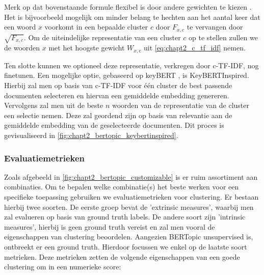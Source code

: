 Merk op dat bovenstaande formule flexibel is door andere gewichten te kiezen \cite{bertopic_c_tf_idf}. Het is bijvoorbeeld mogelijk om minder belang te hechten aan het aantal keer dat een woord $x$ voorkomt in een bepaalde cluster $c$ door $F_{x,c}$ te vervangen door $\sqrt{F_{x,c}}$. Om de uiteindelijke representatie van een cluster $c$ op te stellen zullen we de woorden $x$ met het hoogste gewicht $W_{x,c}$ uit \autoref{eq:chapt2_c_tf_idf} nemen.


Ten slotte kunnen we optioneel deze representatie, verkregen door c-TF-IDF, nog finetunen. Een mogelijke optie, gebaseerd op keyBERT \cite{keybert}, is KeyBERTInspired. Hierbij zal men op basis van c-TF-IDF voor één cluster de best passende documenten selecteren en hiervan een gemiddelde embedding genereren. Vervolgens zal men uit de beste $n$ woorden van de representatie van de cluster een selectie nemen. Deze zal geordend zijn op basis van relevantie aan de gemiddelde embedding van de geselecteerde documenten. Dit proces is gevisualiseerd in \autoref{fig:chapt2_bertopic_keybertinspired}.




\subsubsection{Evaluatiemetrieken}
\label{sec:chapt2_clustering_evaluation}
Zoals afgebeeld in \autoref{fig:chapt2_bertopic_customizable} is er ruim assortiment aan combinaties. Om te bepalen welke combinatie(s) het beste werken voor een specifieke toepassing gebruiken we evaluatiemetrieken voor clustering. Er bestaan hierbij twee soorten. \cite{eval_metrics_scikit,eval_metrics} De eerste groep bevat de 'extrinsic measures', waarbij men zal evalueren op basis van ground truth labels. De andere soort zijn 'intrinsic measures', hierbij is geen ground truth vereist en zal men vooral de eigenschappen van clustering beoordelen. Aangezien BERTopic unsupervised is, ontbreekt er een ground truth. Hierdoor focussen  we enkel op de laatste soort metrieken. Deze metrieken zetten de volgende eigenschappen van een goede clustering om in een numerieke score:


